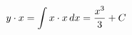 \documentclass[preview]{standalone}
\begin{document}
\begin{align*}
\special{dvisvgm:raw <g id='unique000'>}y \cdot x = \int x \cdot x\,dx = \frac{x^3}{3} + C\special{dvisvgm:raw </g>}
\end{align*}
\end{document}
